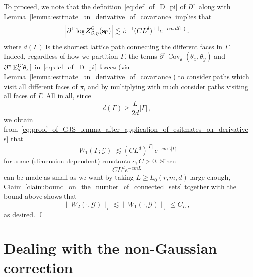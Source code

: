 \documentclass[11pt]{article}
\theoremstyle{definition}
\theoremstyle{remark}
\numberwithin{theorem}{section}
\def\Ga{{\Gamma}}
\newcommand{\bE}{\mathbb E}
\newcommand{\Cov}{\operatorname{Cov}}
\begin{document}
    To proceed, we note that the definition~\eqref{eq:def_of_D_pi} of $D^\pi$ along with Lemma~\ref{lemma:estimate_on_derivative_of_covariance} implies that 
    \begin{equation} \label{eq:proof_of_GJS_lemma_after_application_of_esitmates_on_derivatives}
    \Big|\partial^\Ga \log Z_{\mathcal{G},\eta}^{\sf G} (\mathbf{s}_\Ga) \Big| \lesssim  \beta^{-1} (CL^d)^{|\Ga|} e^{-cm \,  d(\Ga)} \, .    
    \end{equation}
    where $d(\Ga)$ is the shortest lattice path connecting the different faces in $\Ga$. Indeed, regardless of how we partition $\Ga$, the terms $\partial^\pi \Cov_{\mathbf{s}} (\theta_x,\theta_y)$ and $\partial^\pi \, \bE_{\mathbf{s}}^{\sf G}[\theta_x]$ in~\eqref{eq:def_of_D_pi} forces (via Lemma~\ref{lemma:estimate_on_derivative_of_covariance}) to consider paths which visit all different faces of $\pi$, and by multiplying with much consider paths visiting all faces of $\Ga$. All in all, since 
    \[
    d(\Ga) \ge \frac{L}{2d} |\Ga| \, ,
    \]
    we obtain from~\eqref{eq:proof_of_GJS_lemma_after_application_of_esitmates_on_derivatives} that
    \[
    |W_1(\Ga;\mathcal{G})| \lesssim (CL^{d})^{|\Ga|} \, e^{-cm L |\Ga|} 
    \]
    for some (dimension-dependent) constants $c,C>0$. Since
    \[
    C L^{d} e^{-cm L} 
    \]
    can be made as small as we want by taking $L\ge L_0(r,m,d)$ large enough, Claim~\ref{claim:bound_on_the_number_of_connected_sets} together with the bound above shows that 
    \[
    \| W_2(\cdot,\mathcal{G}) \|_r \lesssim \| W_1(\cdot,\mathcal{G}) \|_r  \le C_L \, ,
    \]
    as desired. 
    \qed 
    
    \section{Dealing with the non-Gaussian correction}
    \label{sec:dealing_with_non_gaussian_correction}
    
\end{document}
